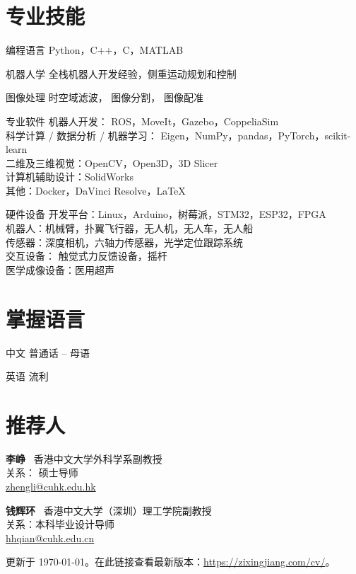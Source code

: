 \documentclass[utf8, 11pt,letterpaper]{report}
\newcommand{\listitemspace}{0.25em}
\renewenvironment{itemize}
{\begin{list}{}{\setlength{\leftmargin}{0em}
			\setlength{\parskip}{0em}
			\setlength{\itemsep}{\listitemspace}
			\setlength{\parsep}{\listitemspace}}}
	{\end{list}}
\begin{document}
\section*{专业技能}
\begin{tablist}
	\item[编程语言] \tab Python，C++，C，MATLAB
	\item[机器人学] \tab 全栈机器人开发经验，侧重运动规划和控制
	\item [图像处理] \tab 时空域滤波， 图像分割， 图像配准
	\item[专业软件] \tab 机器人开发： ROS，MoveIt，Gazebo，CoppeliaSim\\
	科学计算 / 数据分析 / 机器学习： Eigen，NumPy，pandas，PyTorch，scikit-learn\\
	二维及三维视觉：OpenCV，Open3D，3D Slicer\\
	计算机辅助设计：SolidWorks\\
	其他：Docker，DaVinci Resolve，\LaTeX
	\item[硬件设备] \tab 开发平台：Linux，Arduino，树莓派，STM32，ESP32，FPGA\\
	机器人：机械臂，扑翼飞行器，无人机，无人车，无人船\\ 
	传感器：深度相机，六轴力传感器，光学定位跟踪系统\\
	交互设备： 触觉式力反馈设备，摇杆\\
	医学成像设备：医用超声
\end{tablist}


\section*{掌握语言}
\begin{tablist}
	\item[中文] \tab 普通话 -- 母语
	\item[英语] \tab 流利
\end{tablist}
\newpage
\section*{推荐人}
\begin{itemize}
	\item \textbf{李峥}~ 香港中文大学外科学系副教授\\
	关系： 硕士导师\\
	{\scriptsize \faEnvelope}\href{mailto:zhengli@cuhk.edu.hk}{zhengli@cuhk.edu.hk}

	\vspace{10pt}
	\item \textbf{钱辉环}~ 香港中文大学（深圳）理工学院副教授\\
	关系：本科毕业设计导师\\
	{\scriptsize \faEnvelope}\href{mailto:hhqian@cuhk.edu.cn}{hhqian@cuhk.edu.cn}\\

\end{itemize}
	
\begin{center}
	\vfill
	更新于 \monthyeardate\today。在此链接查看最新版本：\href{https://zixingjiang.com/cv/}{https://zixingjiang.com/cv/}。
\end{center}
	
\end{document}
